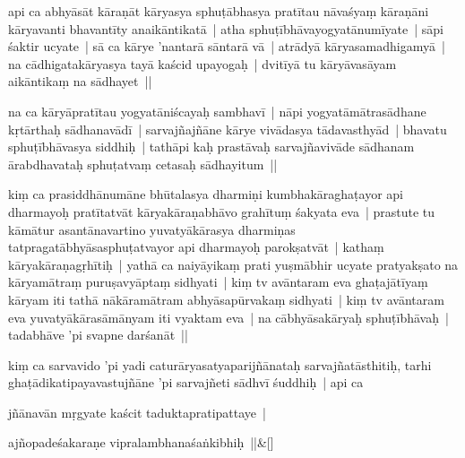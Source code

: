 \documentclass[article,12pt,a4paper]{memoir}%
\newcounter{parCount}
\begin{document}
	  \pstart \leavevmode%
	\label{thakur75-4.3}api ca abhyāsāt kāraṇāt kāryasya sphuṭābhasya pratītau nāvaśyaṃ kāraṇāni kāryavanti bhavantīty anaikāntikatā | atha sphuṭībhāvayogyatānumīyate | sāpi śaktir ucyate | sā ca kārye 'nantarā sāntarā vā | atrādyā kāryasamadhigamyā | na cādhigatakāryasya tayā kaścid upayogaḥ | dvitīyā tu kāryāvasāyam aikāntikaṃ na sādhayet || 
	{}
	\pend%
      

	  \pstart \leavevmode%
	\label{thakur75-4.7}na ca kāryāpratītau yogyatāniścayaḥ sambhavī | nāpi yogyatāmātrasādhane kṛtārthaḥ sādhanavādī | sarvajñajñāne kārye vivādasya tādavasthyād | bhavatu sphuṭībhāvasya siddhiḥ | tathāpi kaḥ prastāvaḥ sarvajñavivāde sādhanam ārabdhavataḥ sphuṭatvaṃ cetasaḥ sādhayitum || 
	{}
	\pend%
      

	  \pstart \leavevmode%
	\label{thakur75-4.11}kiṃ ca prasiddhānumāne bhūtalasya dharmiṇi kumbhakāraghaṭayor api dharmayoḥ pratītatvāt kāryakāraṇabhāvo grahītuṃ śakyata eva | prastute tu kāmātur asantānavartino yuvatyākārasya dharmiṇas tatpragatābhyāsasphuṭatvayor api dharmayoḥ parokṣatvāt | kathaṃ kāryakāraṇagṛhītiḥ | yathā ca naiyāyikaṃ prati yuṣmābhir ucyate pratyakṣato na kāryamātraṃ puruṣavyāptaṃ sidhyati | kiṃ tv avāntaram eva ghaṭajātīyaṃ kāryam iti tathā nākāramātram abhyāsapūrvakaṃ sidhyati | kiṃ tv avāntaram eva yuvatyākārasāmānyam iti vyaktam eva | na cābhyāsakāryaḥ sphuṭībhāvaḥ | tadabhāve 'pi svapne darśanāt || 
	{}
	\pend%
      

	  \pstart \leavevmode%
	\label{thakur75-4.18}kiṃ ca sarvavido 'pi yadi caturāryasatyaparijñānataḥ sarvajñatāsthitiḥ, tarhi ghaṭādikatipayavastujñāne 'pi sarvajñeti sādhvī śuddhiḥ | api ca 
	{}
	\pend%
      

	  \pstart \leavevmode%
	jñānavān mṛgyate kaścit taduktapratipattaye | 
	{}
	\pend%
      
	    
	    \stanza[\smallbreak]
	  ajñopadeśakaraṇe vipralambhanaśaṅkibhiḥ ||\&[\smallbreak]
	  
\end{document}
